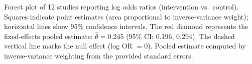 \caption{Forest plot of 12 studies reporting log odds ratios (intervention vs.\ control). Squares indicate point estimates (area proportional to inverse-variance weight); horizontal lines show 95\% confidence intervals. The red diamond represents the fixed-effects pooled estimate: $\hat{\theta} = 0.245$ (95\% CI: 0.196, 0.294). The dashed vertical line marks the null effect (log OR $= 0$). Pooled estimate computed by inverse-variance weighting from the provided standard errors.}
